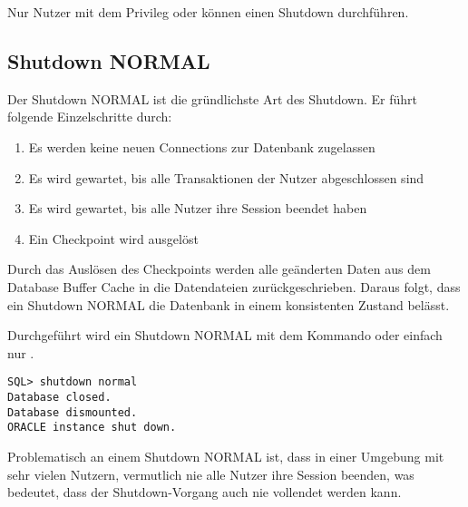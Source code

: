       \begin{merke}
        Nur Nutzer mit dem Privileg  oder  können einen Shutdown durchführen.
      \end{merke}
      \subsection{Shutdown NORMAL}
        Der Shutdown NORMAL ist die gründlichste Art des Shutdown. Er führt folgende Einzelschritte durch:
        \begin{enumerate}
          \item Es werden keine neuen Connections zur Datenbank zugelassen
          \item Es wird gewartet, bis alle Transaktionen der Nutzer abgeschlossen sind
          \item Es wird gewartet, bis alle Nutzer ihre Session beendet haben
          \item Ein Checkpoint wird ausgelöst
        \end{enumerate}
        Durch das Auslösen des Checkpoints werden alle geänderten Daten aus dem Database Buffer Cache in die Datendateien zurückgeschrieben. Daraus folgt, dass ein Shutdown NORMAL die Datenbank in einem konsistenten Zustand belässt.

        Durchgeführt wird ein Shutdown NORMAL mit dem Kommando
        oder einfach nur .
        \begin{lstlisting}[caption={Durchführen eines Shutdown
        NORMAL},label=admin08,language=sqlplus]
SQL> shutdown normal
Database closed.
Database dismounted.
ORACLE instance shut down.
        \end{lstlisting}
         \begin{merke}
           Problematisch an einem Shutdown NORMAL ist, dass in einer Umgebung mit sehr vielen Nutzern, vermutlich nie alle Nutzer ihre Session beenden, was bedeutet, dass der Shutdown-Vorgang auch nie vollendet werden kann.
         \end{merke}
